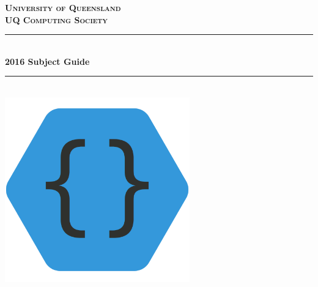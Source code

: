 \begin{titlepage}
	\vspace*{\fill}
	
	\newcommand{\HRule}{\rule{\linewidth}{0.75mm}} %
	
	\center
	
	\textsc{\Large \bfseries University of Queensland}\\[1.75cm]
	\textsc{\LARGE \bfseries UQ Computing Society}\\[1cm]
	
	\HRule \\[0.75cm]
	{\huge \bfseries 2016 Subject Guide}\\[0.4cm] %
	\HRule \\[1.5cm]
	
	\includegraphics[width=8cm]{../assets/logo}\\[1cm]
	
	\vspace*{\fill}
	
	\vfill %
\end{titlepage}